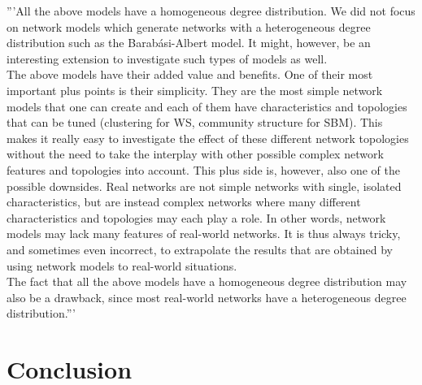 \documentclass[11 pt , letterpaper , twoside , openright]{book}
\begin{document}
'''All the above models have a homogeneous degree distribution. We did not focus on network models which generate networks with a heterogeneous degree distribution such as the Barab\'{a}si-Albert model. It might, however, be an interesting extension to investigate such types of models as well.\\
\newline
The above models have their added value and benefits. One of their most important plus points is their simplicity. They are the most simple network models that one can create and each of them have characteristics and topologies that can be tuned (clustering for WS, community structure for SBM). This makes it really easy to investigate the effect of these different network topologies without the need to take the interplay with other possible complex network features and topologies into account. This plus side is, however, also one of the possible downsides. Real networks are not simple networks with single, isolated characteristics, but are instead complex networks where many different characteristics and topologies may each play a role. In other words, network models may lack many features of real-world networks. It is thus always tricky, and sometimes even incorrect, to extrapolate the results that are obtained by using network models to real-world situations.\\
\newline
The fact that all the above models have a homogeneous degree distribution may also be a drawback, since most real-world networks have a heterogeneous degree distribution.'''

\chapter{Conclusion}
\end{document}
